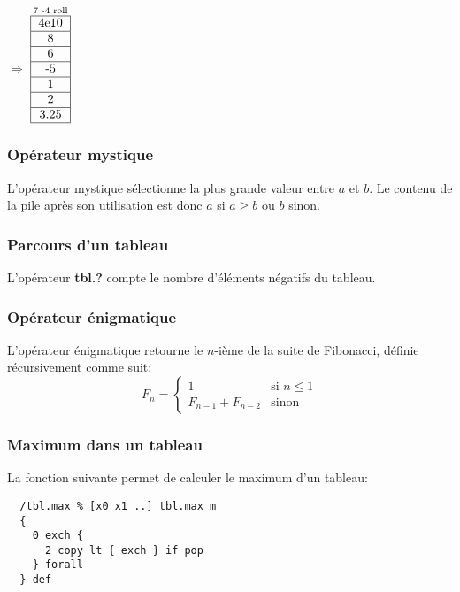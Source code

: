 \documentclass{article}
\newcommand{\key}[1]{{\bf #1}}
\begin{document}
$\Rightarrow$
$\stackrel{\text{7 -4 roll}}{
  \begin{tabular}{|c|}
    \hline 4e10 \\
    \hline 8 \\
    \hline 6 \\
    \hline -5 \\
    \hline 1 \\
    \hline 2 \\
    \hline 3.25 \\
    \hline
\end{tabular}}$

\subsubsection{Opérateur mystique}
L'opérateur mystique sélectionne la plus grande valeur entre $a$ et $b$. Le contenu de la pile après son utilisation est donc $a$ si $a \geq b$ ou $b$ sinon.

\subsubsection{Parcours d'un tableau}
L'opérateur \key{tbl.?} compte le nombre d'éléments négatifs du tableau.

\subsubsection{Opérateur énigmatique}
L'opérateur énigmatique retourne le $n$-ième de la suite de Fibonacci, définie récursivement comme suit:
$$F_n =
\begin{cases}
  1 & \text{si } n \leq 1\\
  F_{n-1} + F_{n-2} & \text{sinon}
\end{cases}
$$

\subsubsection{Maximum dans un tableau}
La fonction suivante permet de calculer le maximum d'un tableau:
\begin{lstlisting}
  /tbl.max % [x0 x1 ..] tbl.max m
  {
    0 exch {
      2 copy lt { exch } if pop
    } forall
  } def
\end{lstlisting}
\end{document}
